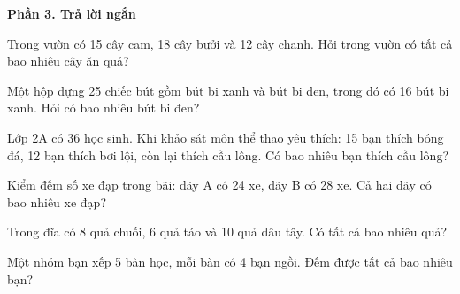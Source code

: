 \textbf{Phần 3. Trả lời ngắn}

\begin{ex} %
Trong vườn có 15 cây cam, 18 cây bưởi và 12 cây chanh. Hỏi trong vườn có tất cả bao nhiêu cây ăn quả?
\end{ex}

\begin{ex} %
Một hộp đựng 25 chiếc bút gồm bút bi xanh và bút bi đen, trong đó có 16 bút bi xanh. Hỏi có bao nhiêu bút bi đen?
\end{ex}

\begin{ex} %
Lớp 2A có 36 học sinh. Khi khảo sát môn thể thao yêu thích: 15 bạn thích bóng đá, 12 bạn thích bơi lội, còn lại thích cầu lông. Có bao nhiêu bạn thích cầu lông?
\end{ex}

\begin{ex} %
Kiểm đếm số xe đạp trong bãi: dãy A có 24 xe, dãy B có 28 xe. Cả hai dãy có bao nhiêu xe đạp?
\end{ex}

\begin{ex} %
Trong đĩa có 8 quả chuối, 6 quả táo và 10 quả dâu tây. Có tất cả bao nhiêu quả?
\end{ex}

\begin{ex} %
Một nhóm bạn xếp 5 bàn học, mỗi bàn có 4 bạn ngồi. Đếm được tất cả bao nhiêu bạn?
\end{ex}
